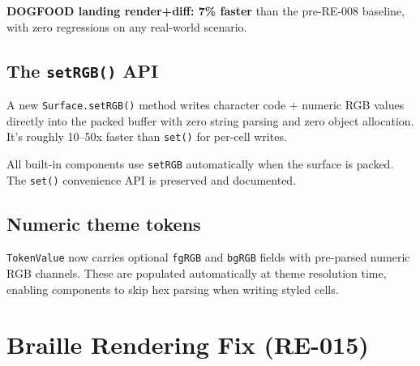 \textbf{DOGFOOD landing render+diff: 7\% faster} than the pre-RE-008 baseline, with zero regressions on any real-world scenario.

\subsection{\texorpdfstring{The \texttt{s\allowbreak{}e\allowbreak{}t\allowbreak{}R\allowbreak{}G\allowbreak{}B\allowbreak{}(\allowbreak{})} API}{The  API}}\label{record-277-the-setrgb-api}

A new \texttt{S\allowbreak{}u\allowbreak{}r\allowbreak{}f\allowbreak{}a\allowbreak{}c\allowbreak{}e\allowbreak{}.\allowbreak{}s\allowbreak{}e\allowbreak{}t\allowbreak{}R\allowbreak{}G\allowbreak{}B\allowbreak{}(\allowbreak{})} method writes character code + numeric RGB values directly into the packed buffer with zero string parsing and zero object allocation. It's roughly 10--50x faster than \texttt{s\allowbreak{}e\allowbreak{}t\allowbreak{}(\allowbreak{})} for per-cell writes.


All built-in components use \texttt{s\allowbreak{}e\allowbreak{}t\allowbreak{}R\allowbreak{}G\allowbreak{}B} automatically when the surface is packed. The \texttt{s\allowbreak{}e\allowbreak{}t\allowbreak{}(\allowbreak{})} convenience API is preserved and documented.

\subsection{Numeric theme tokens}\label{record-277-numeric-theme-tokens}

\texttt{T\allowbreak{}o\allowbreak{}k\allowbreak{}e\allowbreak{}n\allowbreak{}V\allowbreak{}a\allowbreak{}l\allowbreak{}u\allowbreak{}e} now carries optional \texttt{f\allowbreak{}g\allowbreak{}R\allowbreak{}G\allowbreak{}B} and \texttt{b\allowbreak{}g\allowbreak{}R\allowbreak{}G\allowbreak{}B} fields with pre-parsed numeric RGB channels. These are populated automatically at theme resolution time, enabling components to skip hex parsing when writing styled cells.

\section{Braille Rendering Fix (RE-015)}\label{record-277-braille-rendering-fix-re-015}


